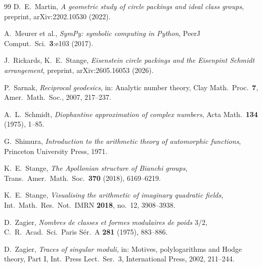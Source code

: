 \documentclass[11pt]{amsart}
\numberwithin{equation}{section}
\theoremstyle{plain}
\theoremstyle{definition}
\theoremstyle{remark}
\begin{document}
\begin{thebibliography}{99}
D.~E.~Martin,
\emph{A geometric study of circle packings and ideal class groups},
preprint, arXiv:2202.10530 (2022).

A.~Meurer et al.,
\emph{SymPy: symbolic computing in Python},
PeerJ Comput.\ Sci.\ \textbf{3}:e103 (2017).

J.~Rickards, K.~E.~Stange,
\emph{Eisenstein circle packings and the Eisenpint Schmidt
arrangement},
preprint, arXiv:2605.16053 (2026).

P.~Sarnak,
\emph{Reciprocal geodesics},
in: Analytic number theory, Clay Math.\ Proc.\ \textbf{7}, Amer.\
Math.\ Soc., 2007, 217--237.

A.~L.~Schmidt,
\emph{Diophantine approximation of complex numbers},
Acta Math.\ \textbf{134} (1975), 1--85.

G.~Shimura,
\emph{Introduction to the arithmetic theory of automorphic
functions},
Princeton University Press, 1971.

K.~E.~Stange,
\emph{The Apollonian structure of Bianchi groups},
Trans.\ Amer.\ Math.\ Soc.\ \textbf{370} (2018), 6169--6219.

K.~E.~Stange,
\emph{Visualising the arithmetic of imaginary quadratic fields},
Int.\ Math.\ Res.\ Not.\ IMRN \textbf{2018}, no.\ 12, 3908--3938.

D.~Zagier,
\emph{Nombres de classes et formes modulaires de poids $3/2$},
C.\ R.\ Acad.\ Sci.\ Paris S\'er.\ A \textbf{281} (1975), 883--886.

D.~Zagier,
\emph{Traces of singular moduli},
in: Motives, polylogarithms and Hodge theory, Part I, Int.\ Press
Lect.\ Ser.\ 3, International Press, 2002, 211--244.

\end{thebibliography}
\end{document}
